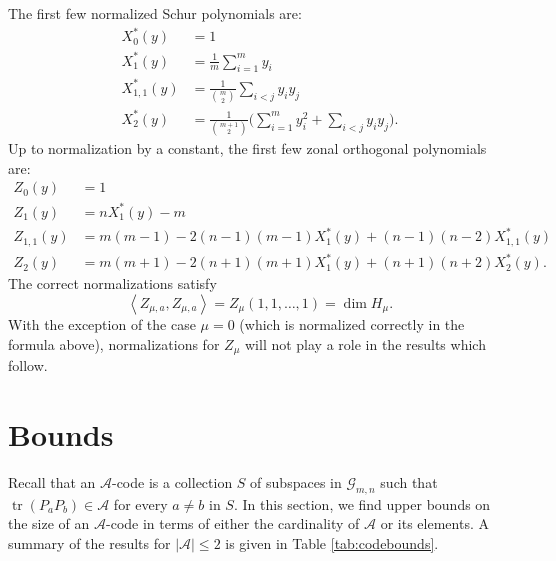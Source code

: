 \documentclass[12pt]{article}
\numberwithin{equation}{section}
\theoremstyle{plainsl}
\newcommand\gras[2]{\mathcal{G}_{#1,#2}}
\newcommand\ip[2]{\left\langle#1,#2\right\rangle}
\newcommand\scr[1]{{\mathcal#1}}
\newcommand\abs[1]{\left|#1\right|}
\newcommand\opk[1]{\mathop{\mathrm{#1}}\nolimits}
\newcommand\tr{\opk{tr}}
\begin{document}
The first few normalized Schur polynomials are:
\begin{align*}
X^*_0(y) & = 1 \\
X^*_1(y) & = \frac{1}{m}\sum_{i=1}^m y_i \\
X^*_{1,1}(y) & = \frac{1}{\binom{m}{2}} \sum_{i<j} y_iy_j \\
X^*_2(y) & = \frac{1}{\binom{m+1}{2}}\Big(\sum_{i=1}^m y_i^2 + \sum_{i<j}y_iy_j \Big).
\end{align*}
Up to normalization by a constant, the first few zonal orthogonal polynomials are:
\begin{align*}
Z_0(y) & = 1 \\
Z_1(y) & = nX^*_1(y) - m \\
Z_{1,1}(y) & = m(m-1) - 2(n-1)(m-1)X^*_1(y) + (n-1)(n-2)X^*_{1,1}(y) \\
Z_2(y) & = m(m+1) - 2(n+1)(m+1)X^*_1(y) + (n+1)(n+2)X^*_{2}(y).
\end{align*}
The correct normalizations satisfy 
\[
\ip{Z_{\mu,a}}{Z_{\mu,a}} = Z_\mu(1,1,\ldots,1) = \dim H_\mu.
\]
With the exception of the case $\mu = 0$ (which is normalized correctly in the formula above), normalizations for $Z_\mu$ will not play a role in the results which follow.

\section{Bounds}
\label{sec:bounds}

Recall that an $\scr{A}$-code is a collection $S$ of subspaces in $\gras{m}{n}$ such that $\tr(P_aP_b) \in \scr{A}$ for every $a \neq b$ in $S$. In this section, we find upper bounds on the size of an $\scr{A}$-code in terms of either the cardinality of $\scr{A}$ or its elements. A summary of the results for $\abs{\scr{A}} \leq 2$ is given in Table \ref{tab:codebounds}.
\end{document}
